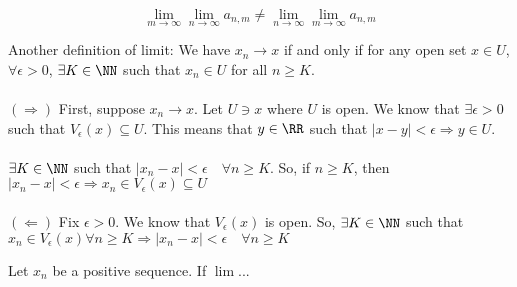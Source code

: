\documentclass[class=scrartcl, crop=false]{standalone}
\begin{document}
\begin{note}
  \[
    \lim_{m \to \infty} \lim_{n \to \infty} a_{n,m} \neq \lim_{n \to \infty} \lim_{m \to \infty} a_{n,m}
  \]
\end{note}
\begin{definition}
  Another definition of limit: We have $x_n \to x$ if and only if for any open set $x \in U$, $\forall \epsilon > 0$, $\exists K \in \NN$ such that  $x_n \in U$ for all $n \geq K$.
  \\\\
  $(\Rightarrow)$ First, suppose $x_n \to x$. Let $U \ni x$ where $U$ is open. We know that $\exists \epsilon > 0$ such that $V_\epsilon(x) \subseteq U$. This means that $y \in \RR$ such that $|x - y| < \epsilon \Rightarrow y \in U$.
  \\\\
  $\exists K \in \NN$ such that  $|x_n - x| < \epsilon \quad \forall n \geq K$. So, if $n \geq K$, then $|x_n - x| < \epsilon \Rightarrow x_n \in V_\epsilon(x) \subseteq U$
  \\\\
  $(\Leftarrow)$ Fix $\epsilon > 0$. We know that $V_\epsilon(x)$ is open. So, $\exists K \in \NN$ such that $x_n \in V_\epsilon(x) \forall n \geq K \Rightarrow |x_n - x| < \epsilon \quad \forall n \geq K$
\end{definition}
\begin{proposition}
  Let $x_n$ be a positive sequence. If $\lim$...
\end{proposition}
\end{document}
